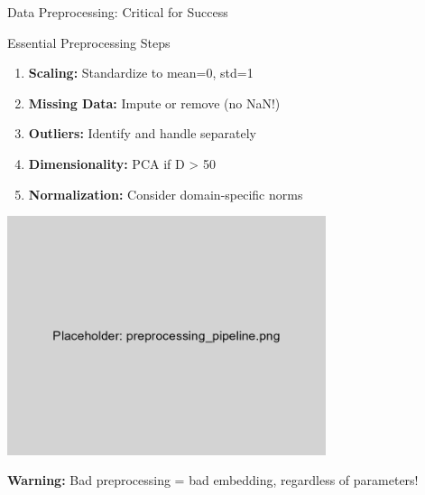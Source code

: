 \documentclass[aspectratio=169]{beamer}
\newcommand{\warning}[1]{\colorbox{red!10}{\textcolor{warningcolor}{\textbf{Warning:} #1}}}
\begin{document}
\begin{frame}{Data Preprocessing: Critical for Success}
\begin{block}{Essential Preprocessing Steps}
\begin{enumerate}
\item \textbf{Scaling:} Standardize to mean=0, std=1
\item \textbf{Missing Data:} Impute or remove (no NaN!)
\item \textbf{Outliers:} Identify and handle separately
\item \textbf{Dimensionality:} PCA if D > 50
\item \textbf{Normalization:} Consider domain-specific norms
\end{enumerate}
\end{block}

\begin{center}
\includegraphics[width=0.7\textwidth]{./Figures/preprocessing_pipeline.png}
\end{center}

\warning{Bad preprocessing = bad embedding, regardless of parameters!}
\end{frame}
\end{document}
